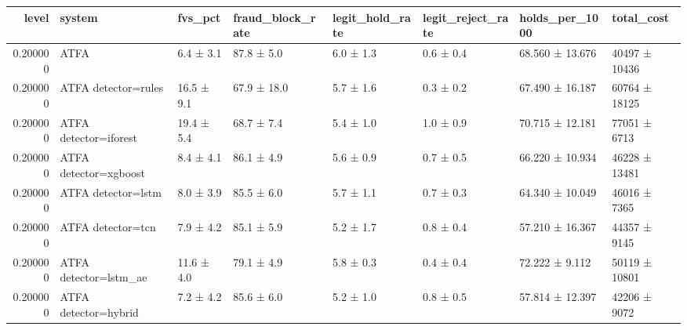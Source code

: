 \begin{tabular}{rlllllll}
\toprule
level & system & fvs\_pct & fraud\_block\_rate & legit\_hold\_rate & legit\_reject\_rate & holds\_per\_1000 & total\_cost \\
\midrule
0.200000 & ATFA & 6.4 ± 3.1 & 87.8 ± 5.0 & 6.0 ± 1.3 & 0.6 ± 0.4 & 68.560 ± 13.676 & 40497 ± 10436 \\
0.200000 & ATFA detector=rules & 16.5 ± 9.1 & 67.9 ± 18.0 & 5.7 ± 1.6 & 0.3 ± 0.2 & 67.490 ± 16.187 & 60764 ± 18125 \\
0.200000 & ATFA detector=iforest & 19.4 ± 5.4 & 68.7 ± 7.4 & 5.4 ± 1.0 & 1.0 ± 0.9 & 70.715 ± 12.181 & 77051 ± 6713 \\
0.200000 & ATFA detector=xgboost & 8.4 ± 4.1 & 86.1 ± 4.9 & 5.6 ± 0.9 & 0.7 ± 0.5 & 66.220 ± 10.934 & 46228 ± 13481 \\
0.200000 & ATFA detector=lstm & 8.0 ± 3.9 & 85.5 ± 6.0 & 5.7 ± 1.1 & 0.7 ± 0.3 & 64.340 ± 10.049 & 46016 ± 7365 \\
0.200000 & ATFA detector=tcn & 7.9 ± 4.2 & 85.1 ± 5.9 & 5.2 ± 1.7 & 0.8 ± 0.4 & 57.210 ± 16.367 & 44357 ± 9145 \\
0.200000 & ATFA detector=lstm\_ae & 11.6 ± 4.0 & 79.1 ± 4.9 & 5.8 ± 0.3 & 0.4 ± 0.4 & 72.222 ± 9.112 & 50119 ± 10801 \\
0.200000 & ATFA detector=hybrid & 7.2 ± 4.2 & 85.6 ± 6.0 & 5.2 ± 1.0 & 0.8 ± 0.5 & 57.814 ± 12.397 & 42206 ± 9072 \\
\bottomrule
\end{tabular}
